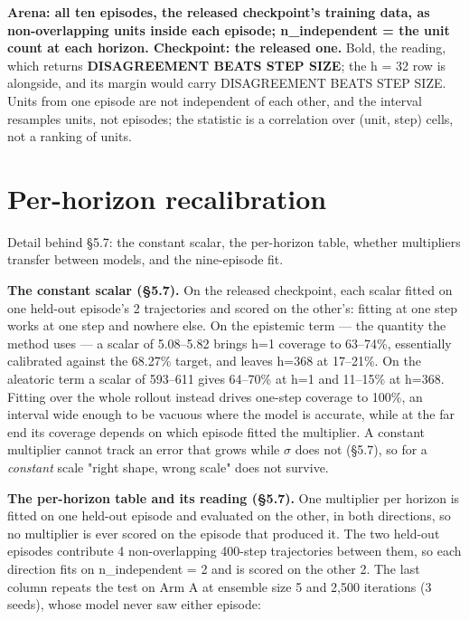 \documentclass[10pt]{article}
\begin{document}
\textbf{Arena: all ten episodes, the released checkpoint's training data, as non-overlapping units inside each episode; n\_independent = the unit count at each horizon. Checkpoint: the released one.} Bold, the reading, which returns \textbf{DISAGREEMENT BEATS STEP SIZE}; the h = 32 row is alongside, and its margin would carry DISAGREEMENT BEATS STEP SIZE. Units from one episode are not independent of each other, and the interval resamples units, not episodes; the statistic is a correlation over (unit, step) cells, not a ranking of units.


\section{Per-horizon recalibration}

Detail behind \S{}5.7: the constant scalar, the per-horizon table, whether multipliers transfer between models, and the nine-episode fit.

\textbf{The constant scalar (\S{}5.7).} On the released checkpoint, each scalar fitted on one held-out episode's 2 trajectories and scored on the other's: fitting at one step works at one step and nowhere else. On the epistemic term --- the quantity the method uses --- a scalar of 5.08--5.82 brings h=1 coverage to 63--74\%, essentially calibrated against the 68.27\% target, and leaves h=368 at 17--21\%. On the aleatoric term a scalar of 593--611 gives 64--70\% at h=1 and 11--15\% at h=368. Fitting over the whole rollout instead drives one-step coverage to 100\%, an interval wide enough to be vacuous where the model is accurate, while at the far end its coverage depends on which episode fitted the multiplier. A constant multiplier cannot track an error that grows while $\sigma$ does not (\S{}5.7), so for a \emph{constant} scale "right shape, wrong scale" does not survive.

\textbf{The per-horizon table and its reading (\S{}5.7).} One multiplier per horizon is fitted on one held-out episode and evaluated on the other, in both directions, so no multiplier is ever scored on the episode that produced it. The two held-out episodes contribute 4 non-overlapping 400-step trajectories between them, so each direction fits on n\_independent = 2 and is scored on the other 2. The last column repeats the test on Arm A at ensemble size 5 and 2,500 iterations (3 seeds), whose model never saw either episode:
\end{document}
